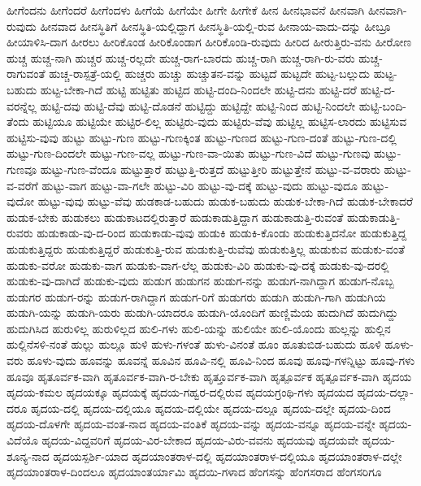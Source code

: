 {ಹೀಗೆಂದನು
ಹೀಗೆಂದರೆ
ಹೀಗೆಂದಳು
ಹೀಗೆಯೆ
ಹೀಗೆಯೇ
ಹೀಗೇ
ಹೀಗೇಕೆ
ಹೀನ
ಹೀನಭಾವನೆ
ಹೀನವಾಗಿ
ಹೀನವಾಗಿ-ರುವುದು
ಹೀನವಾದ
ಹೀನಸ್ಥಿತಿಗೆ
ಹೀನಸ್ಥಿತಿ-ಯಲ್ಲಿದ್ದಾಗ
ಹೀನಸ್ಥಿತಿ-ಯಲ್ಲಿ-ರುವ
ಹೀನಾಯ-ವಾದು-ದನ್ನು
ಹೀಬ್ರೂ
ಹೀಯಾಳಿಸಿ-ದಾಗ
ಹೀರಲು
ಹೀರಿಕೊಂಡ
ಹೀರಿಕೊಂಡಾಗ
ಹೀರಿಕೊಂಡಿ-ರುವುದು
ಹೀರಿದ
ಹೀರುತ್ತಿರು-ವನು
ಹೀರೋಣ
ಹುಚ್ಚ
ಹುಚ್ಚ-ನಾಗಿ
ಹುಚ್ಚರ
ಹುಚ್ಚ-ರಲ್ಲದೇ
ಹುಚ್ಚ-ರಾಗ-ಬಾರದು
ಹುಚ್ಚ-ರಾಗಿ
ಹುಚ್ಚ-ರಾಗಿ-ರು-ವರು
ಹುಚ್ಚ-ರಾಗುವಂತೆ
ಹುಚ್ಚ-ರಾಸ್ಪತ್ರೆ-ಯಲ್ಲಿ
ಹುಚ್ಚರು
ಹುಚ್ಚು
ಹುಚ್ಚುತನ-ವನ್ನು
ಹುಟ್ಟದೆ
ಹುಟ್ಟದೇ
ಹುಟ್ಟ-ಬಲ್ಲುದು
ಹುಟ್ಟ-ಬಹುದು
ಹುಟ್ಟ-ಬೇಕಾ-ಗಿದೆ
ಹುಟ್ಟಿ
ಹುಟ್ಟಿತು
ಹುಟ್ಟಿದ
ಹುಟ್ಟಿ-ದಂದಿ-ನಿಂದಲೇ
ಹುಟ್ಟಿ-ದನು
ಹುಟ್ಟಿ-ದರೆ
ಹುಟ್ಟಿ-ದ-ವರನ್ನೆಲ್ಲ
ಹುಟ್ಟಿ-ದವು
ಹುಟ್ಟಿ-ದೆವು
ಹುಟ್ಟಿ-ದೊಡನೆ
ಹುಟ್ಟಿದ್ದು
ಹುಟ್ಟಿದ್ದೇ
ಹುಟ್ಟಿ-ನಿಂದ
ಹುಟ್ಟಿ-ನಿಂದಲೇ
ಹುಟ್ಟಿ-ಬಂದಿ-ತೆಂದು
ಹುಟ್ಟಿಯೂ
ಹುಟ್ಟಿಯೇ
ಹುಟ್ಟಿರ-ಲಿಲ್ಲ
ಹುಟ್ಟಿರು-ವುದು
ಹುಟ್ಟಿರು-ವೆವು
ಹುಟ್ಟಿಲ್ಲ
ಹುಟ್ಟಿಸ-ಲಾರದು
ಹುಟ್ಟಿಸುವ
ಹುಟ್ಟಿಸು-ವುವು
ಹುಟ್ಟು
ಹುಟ್ಟು-ಗುಣ
ಹುಟ್ಟು-ಗುಣಕ್ಕಿಂತ
ಹುಟ್ಟು-ಗುಣದ
ಹುಟ್ಟು-ಗುಣ-ದಂತೆ
ಹುಟ್ಟು-ಗುಣ-ದಲ್ಲಿ
ಹುಟ್ಟು-ಗುಣ-ದಿಂದಲೇ
ಹುಟ್ಟು-ಗುಣ-ವಲ್ಲ
ಹುಟ್ಟು-ಗುಣ-ವಾ-ಯಿತು
ಹುಟ್ಟು-ಗುಣ-ವಿದೆ
ಹುಟ್ಟು-ಗುಣವು
ಹುಟ್ಟು-ಗುಣವೂ
ಹುಟ್ಟು-ಗುಣ-ವೆಂದೂ
ಹುಟ್ಟುತ್ತಾರೆ
ಹುಟ್ಟುತ್ತಿ-ರುತ್ತದೆ
ಹುಟ್ಟುತ್ತೀರಿ
ಹುಟ್ಟುತ್ತೇನೆ
ಹುಟ್ಟು-ವ-ವರಾರು
ಹುಟ್ಟು-ವ-ವರೆಗೆ
ಹುಟ್ಟು-ವಾಗ
ಹುಟ್ಟು-ವಾ-ಗಲೇ
ಹುಟ್ಟು-ವಿರಿ
ಹುಟ್ಟು-ವು-ದಕ್ಕೆ
ಹುಟ್ಟು-ವುದು
ಹುಟ್ಟು-ವುದೂ
ಹುಟ್ಟು-ವುದೋ
ಹುಟ್ಟು-ವುವು
ಹುಟ್ಟು-ವೆವು
ಹುಡಕಾಡ-ಬಹುದು
ಹುಡುಕ-ಬಹುದು
ಹುಡುಕ-ಬೇಕಾ-ಗಿದೆ
ಹುಡುಕ-ಬೇಕಾದರೆ
ಹುಡುಕ-ಬೇಕು
ಹುಡುಕಲು
ಹುಡುಕಾಟದಲ್ಲಿರುತ್ತಾರೆ
ಹುಡುಕಾಡುತ್ತಿದ್ದಾಗ
ಹುಡುಕಾಡುತ್ತಿ-ರುವಂತೆ
ಹುಡುಕಾಡುತ್ತಿ-ರುವರು
ಹುಡುಕಾಡು-ವು-ದ-ರಿಂದ
ಹುಡುಕಾಡು-ವುವು
ಹುಡುಕಿ
ಹುಡುಕಿ-ಕೊಂಡು
ಹುಡುಕುತ್ತಿದನೋ
ಹುಡುಕುತ್ತಿದ್ದ
ಹುಡುಕುತ್ತಿದ್ದರು
ಹುಡುಕುತ್ತಿದ್ದರೆ
ಹುಡುಕುತ್ತಿ-ರುವ
ಹುಡುಕುತ್ತಿ-ರುವೆವು
ಹುಡುಕುತ್ತಿಲ್ಲ
ಹುಡುಕುವ
ಹುಡುಕು-ವಂತೆ
ಹುಡುಕು-ವರೋ
ಹುಡುಕು-ವಾಗ
ಹುಡುಕು-ವಾಗ-ಲೆಲ್ಲ
ಹುಡುಕು-ವಿರಿ
ಹುಡುಕು-ವು-ದಕ್ಕೆ
ಹುಡುಕು-ವು-ದರಲ್ಲಿ
ಹುಡುಕು-ವು-ದಾಗಿದೆ
ಹುಡುಕು-ವುದು
ಹುಡುಗ
ಹುಡುಗನ
ಹುಡುಗ-ನನ್ನು
ಹುಡುಗ-ನಾಗಿದ್ದಾಗ
ಹುಡುಗ-ನೊಬ್ಬ
ಹುಡುಗರ
ಹುಡುಗ-ರನ್ನು
ಹುಡುಗ-ರಾಗಿದ್ದಾಗ
ಹುಡುಗ-ರಿಗೆ
ಹುಡುಗರು
ಹುಡುಗಿ
ಹುಡುಗಿ-ಗಾಗಿ
ಹುಡುಗಿಯ
ಹುಡುಗಿ-ಯನ್ನು
ಹುಡುಗಿ-ಯರು
ಹುಡುಗಿ-ಯಾದರೂ
ಹುಡುಗಿ-ಯೊಂದಿಗೆ
ಹುಣ್ಣಿಮೆಯ
ಹುದುಗಿದೆ
ಹುದುಗಿದ್ದು
ಹುದುಗಿಸಿದ
ಹುರುಳಿಲ್ಲ
ಹುರುಳಿಲ್ಲದ
ಹುಲಿ-ಗಳು
ಹುಲಿ-ಯನ್ನು
ಹುಲಿಯೇ
ಹುಲಿ-ಯೊಂದು
ಹುಲ್ಲನ್ನು
ಹುಲ್ಲಿನ
ಹುಲ್ಲಿನೆಸಳಿ-ನಂತೆ
ಹುಲ್ಲು
ಹುಲ್ಲೂ
ಹುಳಿ
ಹುಳು-ಗಳಂತೆ
ಹುಳು-ವಿನಂತೆ
ಹೂಂ
ಹೂತುಬಿಡ-ಬಹುದು
ಹೂಳಿ
ಹೂಳು-ವರು
ಹೂಳು-ವುದು
ಹೂವನ್ನು
ಹೂವನ್ನೆ
ಹೂವಿನ
ಹೂವಿ-ನಲ್ಲಿ
ಹೂವಿ-ನಿಂದ
ಹೂವು
ಹೂವು-ಗಳನ್ನಿಟ್ಟು
ಹೂವು-ಗಳು
ಹೂವೂ
ಹೃತೂರ್ವಕ-ವಾಗಿ
ಹೃತೂರ್ವಕ-ವಾಗಿ-ರ-ಬೇಕು
ಹೃತ್ತೂರ್ವಕ-ವಾಗಿ
ಹೃತ್ಪೂರ್ವಕ
ಹೃತ್ಪೂರ್ವಕ-ವಾಗಿ
ಹೃದಯ
ಹೃದಯ-ಕಮಲ
ಹೃದಯಕ್ಕೂ
ಹೃದಯಕ್ಕೆ
ಹೃದಯ-ಗಹ್ವರ-ದಲ್ಲಿರುವ
ಹೃದಯಗ್ರಂಥಿ-ಗಳು
ಹೃದಯದ
ಹೃದಯ-ದಲ್ಲಾ-ದರೂ
ಹೃದಯ-ದಲ್ಲಿ
ಹೃದಯ-ದಲ್ಲಿಯೂ
ಹೃದಯ-ದಲ್ಲಿಯೇ
ಹೃದಯ-ದಲ್ಲೂ
ಹೃದಯ-ದಲ್ಲೇ
ಹೃದಯ-ದಿಂದ
ಹೃದಯ-ದೊಳಗೇ
ಹೃದಯ-ವಂತ-ನಾದ
ಹೃದಯ-ವಂತಿಕೆ
ಹೃದಯ-ವನ್ನು
ಹೃದಯ-ವನ್ನೂ
ಹೃದಯ-ವನ್ನೇ
ಹೃದಯ-ವಿದೆಯೊ
ಹೃದಯ-ವಿದ್ದವರಿಗೆ
ಹೃದಯ-ವಿರ-ಬೇಕಾದ
ಹೃದಯ-ವಿರು-ವವನು
ಹೃದಯವು
ಹೃದಯವೇ
ಹೃದಯ-ಶೂನ್ಯ-ನಾದ
ಹೃದಯಸ್ಪರ್ಶಿ-ಯಾದ
ಹೃದಯಾಂತರಾಳ-ದಲ್ಲಿ
ಹೃದಯಾಂತರಾಳ-ದಲ್ಲಿಯೂ
ಹೃದಯಾಂತರಾಳ-ದಲ್ಲೇ
ಹೃದಯಾಂತರಾಳ-ದಿಂದಲೂ
ಹೃದಯಾಂತರ್ಯಾಮಿ
ಹೃದಯಿ-ಗಳಾದ
ಹೆಂಗಸನ್ನು
ಹೆಂಗಸರಾದ
ಹೆಂಗಸರಿಗೂ
}
